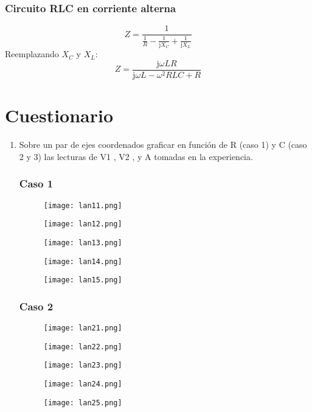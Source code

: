 \documentclass[a4paper,12pt]{report}
\begin{document}
\subsection{Circuito RLC en corriente alterna}
$$
Z = \frac{1}{\frac{1}{R} - \frac{1}{\mathrm{j}X_{C}} + \frac{1}{\mathrm{j}X_{L}}}
$$
Reemplazando $X_{C}$ y $X_{L}$:
$$
Z = \frac{\mathrm{j}\omega L R}{\mathrm{j}\omega L - \omega^{2}RLC + R}
$$
\chapter{Cuestionario}
\begin{enumerate}
\item Sobre un par de ejes coordenados graficar en función de R (caso 1) y C (caso 2 y 3) las lecturas de V1 , V2 , y A tomadas en la experiencia.
\subsection*{Caso 1}
\begin{figure}[H]
\centering
\texttt{[image: lan11.png]}
\end{figure}
\begin{figure}[H]
\centering
\texttt{[image: lan12.png]}
\end{figure}
\begin{figure}[H]
\centering
\texttt{[image: lan13.png]}
\end{figure}
\begin{figure}[H]
\centering
\texttt{[image: lan14.png]}
\end{figure}
\begin{figure}[H]
\centering
\texttt{[image: lan15.png]}
\end{figure}
\subsection*{Caso 2}
\begin{figure}[H]
\centering
\texttt{[image: lan21.png]}
\end{figure}
\begin{figure}[H]
\centering
\texttt{[image: lan22.png]}
\end{figure}
\begin{figure}[H]
\centering
\texttt{[image: lan23.png]}
\end{figure}
\begin{figure}[H]
\centering
\texttt{[image: lan24.png]}
\end{figure}
\begin{figure}[H]
\centering
\texttt{[image: lan25.png]}
\end{figure}

\end{enumerate}
\end{document}
